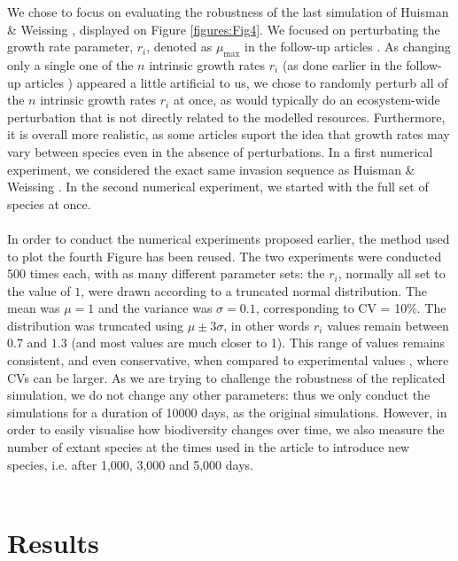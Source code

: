We chose to focus on evaluating the robustness of the last simulation of Huisman \& Weissing \cite{1999:Huisman}, displayed on Figure \ref{figures:Fig4}. We focused on perturbating the growth rate parameter, $r_i$, denoted as $\mu_{\text{max}}$ in the follow-up articles \cite{2001:Schippers, 2001:Huisman}. As changing only a single one of the $n$ intrinsic growth rates $r_i$ (as done earlier in the follow-up articles \cite{2001:Schippers, 2001:Huisman}) appeared a little artificial to us, we chose to randomly perturb all of the $n$ intrinsic growth rates $r_i$ at once, as would typically do an ecosystem-wide perturbation that is not directly related to the modelled resources. Furthermore, it is overall more realistic, as some articles \cite{2015:Edwards} suport the idea that growth rates may vary between species even in the absence of perturbations. In a first numerical experiment, we considered the exact same invasion sequence as Huisman \& Weissing \cite{1999:Huisman}.  In the second numerical experiment, we started with the full set of species at once.\\
\\
In order to conduct the numerical experiments proposed earlier, the method used to plot the fourth Figure has been reused. The two experiments were conducted 500 times each, with as many different parameter sets: the $r_i$, normally all set to the value of $1$, were drawn according to a truncated normal distribution. The mean was $\mu=1$ and the variance was $\sigma=0.1$, corresponding to CV = 10\%. The distribution was truncated using $\mu\pm3\sigma$, in other words $r_i$ values remain between $0.7$ and $1.3$ (and most values are much closer to 1). This range of values remains consistent, and even conservative, when compared to experimental values \cite{2015:Edwards}, where CVs can be larger. As we are trying to challenge the robustness of the replicated simulation, we do not change any other parameters: thus we only conduct the simulations for a duration of 10000 days, as the original simulations. However, in order to easily visualise how biodiversity changes over time, we also measure the number of extant species at the times used in the article to introduce new species, i.e. after 1,000, 3,000 and 5,000 days.\\~\\ 

\section{Results}

